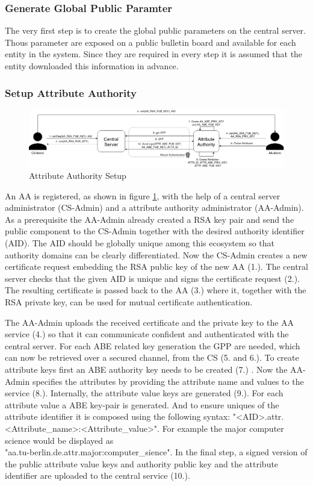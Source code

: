 \subsubsection{Generate Global Public Paramter}
The very first step is to create the global public parameters on the central server. Thous parameter are exposed on a public bulletin board and available for each entity in the system. Since they are required in every step it is assumed that the entity downloaded this information in advance. 


\subsubsection{Setup Attribute Authority}
\begin{figure}[!h]
\centering
    \includegraphics[width=\linewidth]{img/aa_setup.png}
    \caption{Attribute Authority Setup}
    \label{fig:aa-setup}
\end{figure}
An AA is registered, as shown in figure \ref{fig:aa-setup}, with the help of a central server administrator (CS-Admin) and a attribute authority administrator (AA-Admin). As a prerequisite the AA-Admin already created a RSA key pair and send the public component to the CS-Admin together with the desired authority identifier (AID). The AID should be globally unique among this ecosystem so that authority domains can be clearly differentiated. Now the CS-Admin creates a new certificate request embedding the RSA public key of the new AA (1.). The central server checks that the given AID is unique and signs the certificate request (2.). The resulting certificate is passed back to the AA (3.) where it, together with the RSA private key, can be used for mutual certificate authentication. 

The AA-Admin uploads the received certificate and the private key to the AA service (4.) so that it can communicate confident and authenticated with the central server. For each ABE related key generation the GPP are needed, which can now be retrieved over a secured channel, from the CS (5. and 6.). To create attribute keys first an ABE authority key needs to be created (7.) . Now the AA-Admin specifies the attributes by providing the attribute name and values to the service (8.). Internally, the attribute value keys are generated (9.). For each attribute value a ABE key-pair is generated. And to ensure uniques of the attribute identifier it is composed using the following syntax: "<AID>.attr.<Attribute\_name>:<Attribute\_value>". For example the major computer science would be displayed as \\"aa.tu-berlin.de.attr.major:computer\_sience". In the final step, a signed version of the public attribute value keys and authority public key and the attribute identifier are uploaded to the central service (10.).

